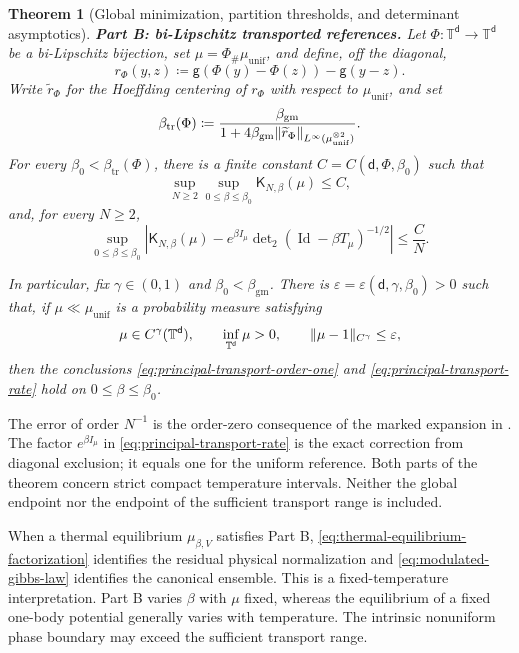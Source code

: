 \documentclass[11pt,reqno]{amsart}
\numberwithin{equation}{section}
\theoremstyle{plain}
\newtheorem{thm}{Theorem}[section]
\theoremstyle{definition}
\DeclarePairedDelimiter{\norm}{\lVert}{\rVert}
\renewcommand{\d}{\mathsf d}
\newcommand{\T}{\mathbb T}
\newcommand{\Id}{\operatorname{Id}}
\newcommand{\be}{\beta}
\newcommand{\vep}{\varepsilon}
\newcommand{\g}{\mathsf g}
\newcommand{\K}{\mathsf K}
\newcommand{\tl}{\widetilde}
\newcommand{\muunif}{\mu_{\mathrm{unif}}}
\newcommand{\gm}{\mathrm{gm}}
\newcommand{\tr}{\mathrm{tr}}
\begin{document}
\begin{thm}[Global minimization, partition thresholds, and determinant asymptotics]
\smallskip
\noindent\textup{\textbf{Part B: bi-Lipschitz transported references.}}
\label{thm:transported}
Let $\Phi:\T^{\d}\to\T^{\d}$ be a bi-Lipschitz bijection, set $\mu=\Phi_{\#}\muunif$, and define, off the diagonal,
\begin{equation}
 r_{\Phi}(y,z)\coloneqq\g(\Phi(y)-\Phi(z))-\g(y-z).
 \label{eq:pullback-remainder}
\end{equation}
Write $\tl r_{\Phi}$ for the Hoeffding centering of $r_{\Phi}$ with respect to $\muunif$, and set
\begin{equation}
 \beta_{\tr}(\Phi)
 \coloneqq\frac{\beta_{\gm}}
 {1+4\beta_{\gm}\norm{\tl r_{\Phi}}_{L^\infty(\muunif^{\otimes2})}}.
 \label{eq:transport-threshold}
\end{equation}
For every $\be_0<\beta_{\tr}(\Phi)$, there is a finite constant $C=C(\d,\Phi,\be_0)$ such that
\begin{equation}
 \sup_{N\geq2}\sup_{0\leq\be\leq\be_0}\K_{N,\be}(\mu)\leq C,
 \label{eq:principal-transport-order-one}
\end{equation}
and, for every $N\geq2$,
\begin{equation}
 \sup_{0\leq\be\leq\be_0}
 \left|\K_{N,\be}(\mu)
 -e^{\be I_{\mu}}\det\nolimits_2(\Id-\be T_{\mu})^{-1/2}\right|
 \leq \frac C N.
 \label{eq:principal-transport-rate}
\end{equation}

In particular, fix $\gamma\in(0,1)$ and $\be_0<\beta_{\gm}$.  There is $\vep=\vep(\d,\gamma,\be_0)>0$ such that, if $\mu\ll\muunif$ is a probability measure satisfying
\begin{equation}
 \mu\in C^\gamma(\T^{\d}),
 \qquad
 \inf_{\T^{\d}}\mu>0,
 \qquad
 \norm{\mu-1}_{C^\gamma}\leq\vep,
 \label{eq:near-uniform-hypothesis}
\end{equation}
then the conclusions \eqref{eq:principal-transport-order-one} and \eqref{eq:principal-transport-rate} hold on $0\leq\be\leq\be_0$.
\end{thm}

The error of order $N^{-1}$ is the order-zero consequence of the marked expansion in . The factor $e^{\be I_\mu}$ in \eqref{eq:principal-transport-rate} is the exact correction from diagonal exclusion; it equals one for the uniform reference. Both parts of the theorem concern strict compact temperature intervals. Neither the global endpoint nor the endpoint of the sufficient transport range is included.

When a thermal equilibrium $\mu_{\be,V}$ satisfies Part B, \eqref{eq:thermal-equilibrium-factorization} identifies the residual physical normalization and \eqref{eq:modulated-gibbs-law} identifies the canonical ensemble. This is a fixed-temperature interpretation. Part B varies $\be$ with $\mu$ fixed, whereas the equilibrium of a fixed one-body potential generally varies with temperature. The intrinsic nonuniform phase boundary may exceed the sufficient transport range.
\end{document}
